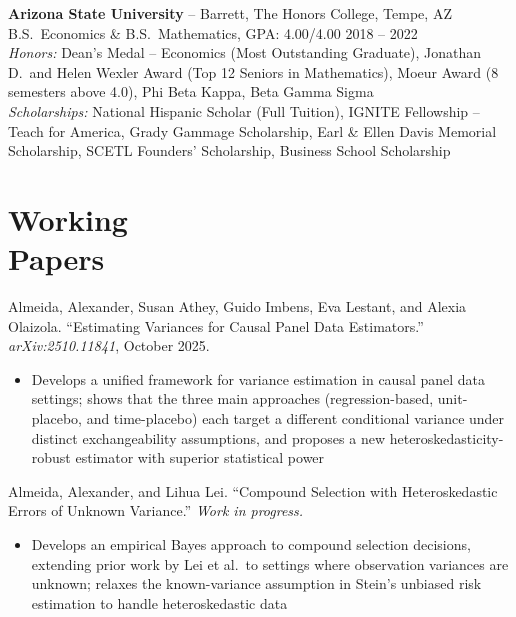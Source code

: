 \documentclass[line, margin, 10pt]{res}
\begin{document}
\begin{resume}
\vspace{4pt}

\textbf{Arizona State University} -- Barrett, The Honors College, Tempe, AZ \\
B.S.\ Economics \& B.S.\ Mathematics, GPA: 4.00/4.00 \hfill 2018 -- 2022 \\[2pt]
\textit{Honors:} Dean's Medal -- Economics (Most Outstanding Graduate),
Jonathan D.\ and Helen Wexler Award (Top 12 Seniors in Mathematics),
Moeur Award (8 semesters above 4.0), Phi Beta Kappa, Beta Gamma Sigma \\[2pt]
\textit{Scholarships:} National Hispanic Scholar (Full Tuition),
IGNITE Fellowship -- Teach for America, Grady Gammage Scholarship,
Earl \& Ellen Davis Memorial Scholarship, SCETL Founders' Scholarship,
Business School Scholarship

\section{\sc Working\\ Papers}

Almeida, Alexander, Susan Athey, Guido Imbens, Eva Lestant, and Alexia Olaizola.
``Estimating Variances for Causal Panel Data Estimators.''
\textit{arXiv:2510.11841}, October 2025.
\begin{itemize}
  \item Develops a unified framework for variance estimation in causal panel data
        settings; shows that the three main approaches (regression-based,
        unit-placebo, and time-placebo) each target a different conditional variance
        under distinct exchangeability assumptions, and proposes a new
        heteroskedasticity-robust estimator with superior statistical power
\end{itemize}

\vspace{2pt}

Almeida, Alexander, and Lihua Lei.
``Compound Selection with Heteroskedastic Errors of Unknown Variance.''
\textit{Work in progress.}
\begin{itemize}
  \item Develops an empirical Bayes approach to compound selection decisions,
        extending prior work by Lei et al.\ to settings where observation variances
        are unknown; relaxes the known-variance assumption in Stein's unbiased risk
        estimation to handle heteroskedastic data
\end{itemize}


\end{resume}
\end{document}
